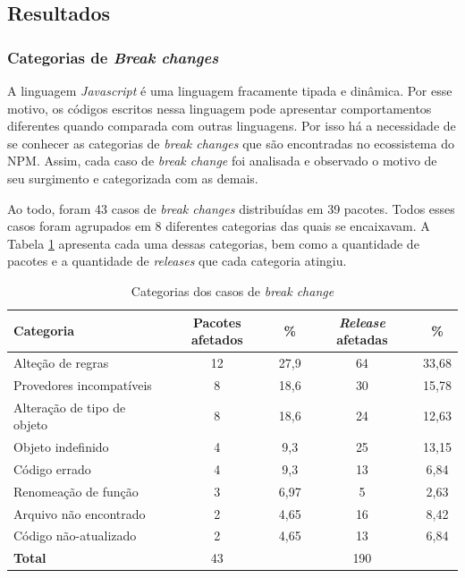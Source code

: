 \subsection{Resultados}
\label{fin:rq2}

\subsubsection{Categorias de \textit{Break changes}}
A linguagem \textit{Javascript} é uma linguagem fracamente tipada e dinâmica. Por esse motivo, os códigos escritos nessa linguagem pode apresentar comportamentos diferentes quando comparada com outras linguagens. Por isso há a necessidade de se conhecer as  categorias de \textit{break changes} que são encontradas no ecossistema do \gls{NPM}. Assim, cada caso de \textit{break change} foi analisada e observado o motivo de seu surgimento e categorizada com as demais.

Ao todo, foram 43 casos de \textit{break changes} distribuídas em 39 pacotes. Todos esses casos foram agrupados em 8 diferentes categorias das quais se encaixavam. A Tabela \ref{tab:bc_category} apresenta cada uma dessas categorias, bem como a quantidade de pacotes e a quantidade de \textit{releases} que cada categoria atingiu.

\begin{table}[]
\begin{tabular}{|l|c|c|c|c|}
\hline
\centering
\textbf{Categoria}           & \textbf{Pacotes afetados} & \textbf{\%}   & \textbf{\textit{Release} afetadas} & \textbf{\%}    \\ \hline
Alteção de regras            & 12              & 27,9 & 64                          & 33,68 \\
Provedores incompatíveis     & 8               & 18,6 & 30                          & 15,78 \\
Alteração de tipo de objeto  & 8               & 18,6 & 24                          & 12,63 \\
Objeto indefinido            & 4               & 9,3  & 25                          & 13,15 \\
Código errado                & 4               & 9,3  & 13                          & 6,84  \\
Renomeação de função         & 3               & 6,97 & 5                           & 2,63  \\
Arquivo não encontrado       & 2               & 4,65 & 16                          & 8,42  \\
Código não-atualizado        & 2               & 4,65 & 13                          & 6,84  \\ \hline
\textbf{Total}               & 43              &      & 190                         &       \\ \hline
\end{tabular}
\caption{Categorias dos casos de \textit{break change}}
\label{tab:bc_category}
\end{table}

